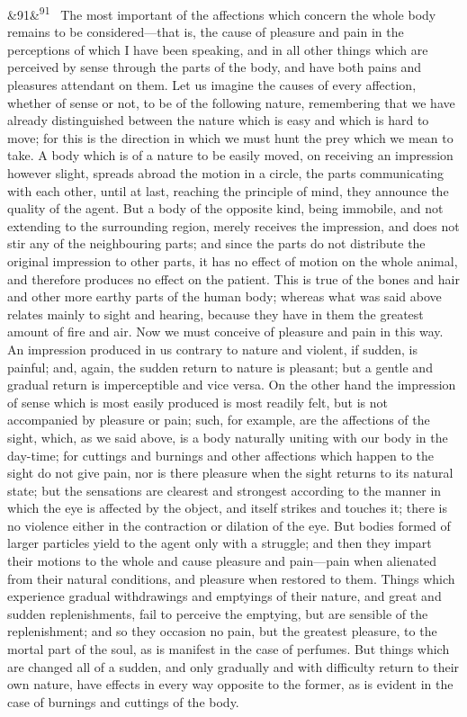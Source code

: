 \documentclass[12pt]{article}
\newcommand{\para}[1][]{\par\noindent\ifx&#1&\else\textsuperscript{\footnotesize #1}~\fi}
\begin{document}
\para[91] The most important of the affections which concern the whole body remains to be considered---that is, the cause of pleasure and pain in the perceptions of which I have been speaking, and in all other things which are perceived by sense through the parts of the body, and have both pains and pleasures attendant on them. Let us imagine the causes of every affection, whether of sense or not, to be of the following nature, remembering that we have already distinguished between the nature which is easy and which is hard to move; for this is the direction in which we must hunt the prey which we mean to take. A body which is of a nature to be easily moved, on receiving an impression however slight, spreads abroad the motion in a circle, the parts communicating with each other, until at last, reaching the principle of mind, they announce the quality of the agent. But a body of the opposite kind, being immobile, and not extending to the surrounding region, merely receives the impression, and does not stir any of the neighbouring parts; and since the parts do not distribute the original impression to other parts, it has no effect of motion on the whole animal, and therefore produces no effect on the patient. This is true of the bones and hair and other more earthy parts of the human body; whereas what was said above relates mainly to sight and hearing, because they have in them the greatest amount of fire and air. Now we must conceive of pleasure and pain in this way. An impression produced in us contrary to nature and violent, if sudden, is painful; and, again, the sudden return to nature is pleasant; but a gentle and gradual return is imperceptible and vice versa. On the other hand the impression of sense which is most easily produced is most readily felt, but is not accompanied by pleasure or pain; such, for example, are the affections of the sight, which, as we said above, is a body naturally uniting with our body in the day-time; for cuttings and burnings and other affections which happen to the sight do not give pain, nor is there pleasure when the sight returns to its natural state; but the sensations are clearest and strongest according to the manner in which the eye is affected by the object, and itself strikes and touches it; there is no violence either in the contraction or dilation of the eye. But bodies formed of larger particles yield to the agent only with a struggle; and then they impart their motions to the whole and cause pleasure and pain---pain when alienated from their natural conditions, and pleasure when restored to them. Things which experience gradual withdrawings and emptyings of their nature, and great and sudden replenishments, fail to perceive the emptying, but are sensible of the replenishment; and so they occasion no pain, but the greatest pleasure, to the mortal part of the soul, as is manifest in the case of perfumes. But things which are changed all of a sudden, and only gradually and with difficulty return to their own nature, have effects in every way opposite to the former, as is evident in the case of burnings and cuttings of the body.
\end{document}
